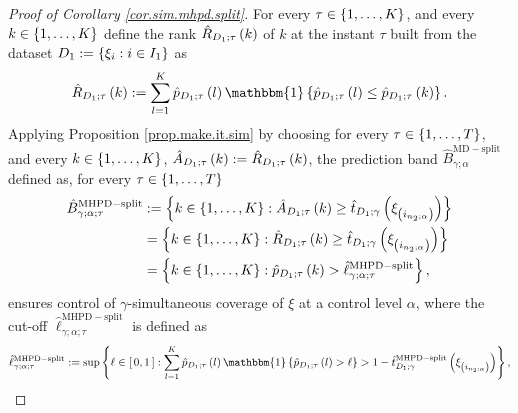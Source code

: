 \documentclass[11pt]{article}
\begin{document}
\begin{proof}[Proof of Corollary \ref{cor.sim.mhpd.split}]
For every $\tau \in \left\{ 1, \ldots, K \right\}$, and every $k \in \left\{ 1, \ldots, K \right\}$
define the rank $\hat{R}_{D_1; \tau}\left( k \right)$ of $k$ at the instant $\tau$
built from the dataset $D_1 := \left\{ \xi_i : i \in I_1 \right\}$ as
\begin{align}
\label{eq.rank.D1}
    \hat{R}_{D_1; \tau}\paren{k}
    :=
    \sum_{l = 1}^{K}
    \hat{p}_{D_1; \tau} \paren{l}
    \mathbbm{1} \brac{
        \hat{p}_{D_1; \tau} \paren{l}
        \leq \hat{p}_{D_1; \tau} \paren{k}
    }.
\end{align}
%
%
%
Applying Proposition \ref{prop.make.it.sim} by choosing for every $\tau \in \left\{ 1, \ldots, T \right\}$,
and every $k \in \left\{ 1, \ldots, K \right\}$, $\hat{A}_{D_1; \tau} \left( k \right) := \hat{R}_{D_1; \tau} \left( k \right)$,
the prediction band $\hat{B}^{\mathrm{MD-split}}_{\gamma; \alpha}$ defined as,
for every $\tau \in \left\{ 1, \ldots, T \right\}$
\begin{align*}
    \hat{B}_{\gamma; \alpha; \tau}^{\mathrm{MHPD-split}}
    &
    :=
    \left\{ 
        k \in \left\{ 1, \ldots, K \right\} :
        \hat{A}_{D_1; \tau} \left( k \right)
        \geq
        \hat{t}_{D_1; \gamma} \left( \xi_{\left( i_{n_2; \alpha} \right)} \right)
     \right\}
    \\
    &
    = \left\{ 
        k \in \left\{ 1, \ldots, K \right\} :
        \hat{R}_{D_1; \tau} \left( k \right)
        \geq
        \hat{t}_{D_1; \gamma} \left( \xi_{\left( i_{n_2; \alpha} \right)} \right)
     \right\}
    \\
    &
    =
    \left\{ 
        k \in \left\{ 1, \ldots, K \right\} :
        \hat{p}_{D_1; \tau}\left( k \right) > \hat{\ell}_{\gamma; \alpha; \tau}^{\mathrm{MHPD-split}}
     \right\},
\end{align*}
ensures control of $\gamma$-simultaneous coverage of $\xi$ at a control level $\alpha$,
where the cut-off $\hat{\ell}_{\gamma; \alpha; \tau}^{\mathrm{MHPD-split}}$ is defined as
\begin{align}
\label{eq.threshold.sim.hpd.split}
    \hat{\ell}_{\gamma; \alpha; \tau}^{\mathrm{MHPD-split}}
    := \sup
    \brac{
        \ell \in \croch{0, 1}
        : \sum_{l = 1}^{K}
        \hat{p}_{D_1; \tau} \paren{l}
        \mathbbm{1} \brac{
            \hat{p}_{D_1; \tau} \paren{l}
            > \ell
        } 
        > 1 - \hat{t}_{D_1; \gamma}^{\mathrm{MHPD-split}} \paren{\xi_{\paren{i_{n_2; \alpha}}}}
    },
\end{align}   
\end{proof}
\end{document}
